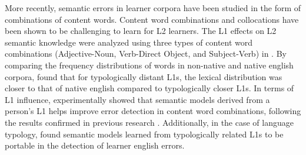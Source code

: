 \documentclass[10pt,letterpaper]{article}
\begin{document}
More recently, semantic errors in learner corpora have been studied in the form of combinations of content words. Content word combinations and collocations have been shown to be challenging to learn  for L2 learners. The L1 effects on L2 semantic knowledge were analyzed using three types of content word combinations (Adjective-Noun, Verb-Direct Object, and Subject-Verb) in \cite{kochmarCrossLingualLexicoSemanticTransfer2016, kochmarModellingSemanticAcquisition2017}. By comparing the frequency distributions of words in non-native and native english corpora,  found that for typologically distant L1s, the lexical distribution was closer to that of native english compared to typologically closer L1s. In terms of L1 influence,  experimentally showed that semantic models derived from a person's L1 helps improve error detection in content word combinations, following the results confirmed in previous research . Additionally, in the case of language typology,  found semantic models learned from typologically related L1s to be portable in the detection of learner english errors.

\end{document}
